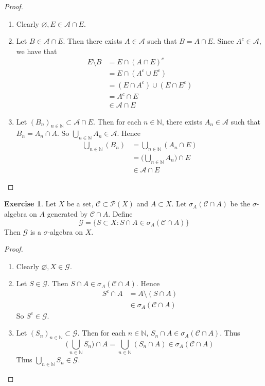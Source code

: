 \documentclass[12pt]{amsart}
\theoremstyle{definition}
\newtheorem{ex}[definition]{Exercise}
\newcommand{\sig}{\sigma}
\newcommand{\N}{\mathbb{N}}
\newcommand{\MA}{\mathcal{A}}
\newcommand{\MC}{\mathcal{C}}
\newcommand{\MG}{\mathcal{G}}
\newcommand{\MP}{\mathcal{P}}
\newcommand{\lex}[1]{\label{ex:#1}}
\begin{document}
	\begin{proof}\
		\begin{enumerate}
			\item Clearly $\varnothing, E \in \MA \cap E$.
			\item Let $B \in \MA \cap E$. Then there exists $A \in \MA$ such that $B = A \cap E$. Since $A^c \in \MA$, we have that 
			\begin{align*}
				E \setminus B 
				&= E \cap (A \cap E)^c \\
				&= E \cap (A^c \cup E^c) \\
				&= (E \cap A^c) \cup (E \cap E^c) \\
				&= A^c \cap E \\
				&\in \MA \cap E
			\end{align*}
			\item Let $(B_n)_{n \in \N} \subset \MA \cap E$. Then for each $n \in \N$, there exists $A_n \in \MA$ such that $B_n = A_n \cap A$. So $\bigcup\limits_{n \in \N}A_n \in \MA$. Hence 
			\begin{align*}
				\bigcup_{n \in \N}(B_n) 
				&= \bigcup_{n \in \N}(A_n \cap E) \\
				&= \bigg( \bigcup_{n \in \N}A_n \bigg) \cap E \\
				& \in \MA \cap E
			\end{align*}
		\end{enumerate}
	\end{proof}
	
	\begin{ex} \lex{00000} 
		Let $X$ be a set, $\MC \subset \MP(X)$ and $A \subset X$. Let $\sig_A(\MC \cap A)$ be the $\sig$-algebra on $A$ generated by $\MC \cap A$. Define $$\MG = \{S \subset X: S \cap A \in \sig_A(\MC \cap A)\}$$ 
		Then $\MG$ is a $\sig$-algebra on $X$. 
	\end{ex}
	
	\begin{proof}\
		\begin{enumerate}
			\item Clearly $\varnothing, X \in \MG$. 
			\item Let $S \in \MG$. Then $S \cap A \in \sig_A(\MC \cap A)$. Hence 
			\begin{align*}
				S^c \cap A 
				&= A \setminus (S \cap A)  \\
				& \in \sig_A(\MC \cap A)
			\end{align*}				
			So $S^c \in \MG$. 
			\item Let $(S_n)_{n \in \N} \subset \MG$. Then for each $n \in \N$, $S_n \cap A \in \sig_A(\MC \cap A)$. Thus $$\bigg( \bigcup_{n \in \N} S_n \bigg) \cap A = \bigcup\limits_{n \in \N}(S_n \cap A) \in \sig_A(\MC \cap A)$$ Thus $\bigcup\limits_{n \in \N} S_n \in \MG$.
		\end{enumerate}
	\end{proof}
	
\end{document}
